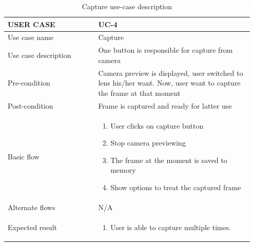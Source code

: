 \begin{center}
\begin{table} [H]
\caption{Capture use-case description} 
\begin{tabular}{p{0.35\linewidth} | p{0.6\linewidth}}
\hline
USER CASE            & UC-4 \\ \hline
Use case name        &  Capture \\ \hline
Use case description &  One button is responsible for capture from camera     \\\hline
Pre-condition         &   Camera preview is displayed, user switched to lens his/her want. Now, user want to capture the frame at that moment  \\ \hline
Post-condition        &   Frame is captured and ready for latter use  \\ \hline
Basic flow           &   \begin{enumerate}
    \item 	User clicks on capture button
\item Stop camera previewing
\item The frame at the moment is saved to memory
\item Show options to treat the captured frame
\end{enumerate}
\\ \hline
Alternate flows      & N/A     \\ \hline
Expected result      &  
\begin{enumerate}
    \item User is able to capture multiple times.
\end{enumerate}   \\ \hline
\end{tabular}
\end{table}
\end{center}


